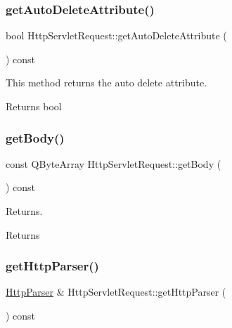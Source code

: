 \subsubsection{\texorpdfstring{get\+Auto\+Delete\+Attribute()}{getAutoDeleteAttribute()}}
{\footnotesize\ttfamily bool Http\+Servlet\+Request\+::get\+Auto\+Delete\+Attribute (\begin{DoxyParamCaption}{ }\end{DoxyParamCaption}) const}



This method returns the auto delete attribute. 

\begin{DoxyReturn}{Returns}
bool 
\end{DoxyReturn}
\mbox{\label{class_http_servlet_request_a94c089ed1819811cd02bd0c69f3546ca}} 
\subsubsection{\texorpdfstring{get\+Body()}{getBody()}}
{\footnotesize\ttfamily const Q\+Byte\+Array Http\+Servlet\+Request\+::get\+Body (\begin{DoxyParamCaption}{ }\end{DoxyParamCaption}) const}



Returns. 

\begin{DoxyReturn}{Returns}

\end{DoxyReturn}
\mbox{\label{class_http_servlet_request_a26064824e0d709ee032b889147acd579}} 
\subsubsection{\texorpdfstring{get\+Http\+Parser()}{getHttpParser()}}
{\footnotesize\ttfamily \mbox{\hyperlink{class_http_parser}{Http\+Parser}} \& Http\+Servlet\+Request\+::get\+Http\+Parser (\begin{DoxyParamCaption}{ }\end{DoxyParamCaption}) const}



